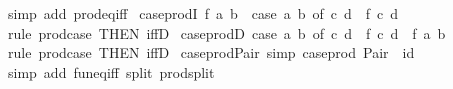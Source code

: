 \begin{isabellebody}
\ {\isacharparenleft}{\kern0pt}simp\ add{\isacharcolon}{\kern0pt}\ prod{\isacharunderscore}{\kern0pt}eq{\isacharunderscore}{\kern0pt}iff{\isacharparenright}{\kern0pt}%
\endisatagproof
{\isafoldproof}%
%
\isadelimproof
\isanewline
%
\endisadelimproof
\isanewline
{}\isamarkupfalse%
\ case{\isacharunderscore}{\kern0pt}prodI{\isacharcolon}{\kern0pt}\ {\isachardoublequoteopen}f\ a\ b\ {\isasymLongrightarrow}\ case\ {\isacharparenleft}{\kern0pt}a{\isacharcomma}{\kern0pt}\ b{\isacharparenright}{\kern0pt}\ of\ {\isacharparenleft}{\kern0pt}c{\isacharcomma}{\kern0pt}\ d{\isacharparenright}{\kern0pt}\ {\isasymRightarrow}\ f\ c\ d{\isachardoublequoteclose}\isanewline
%
\isadelimproof
\ \ %
\endisadelimproof
%
\isatagproof
{}\isamarkupfalse%
\ {\isacharparenleft}{\kern0pt}rule\ prod{\isachardot}{\kern0pt}case\ {\isacharbrackleft}{\kern0pt}THEN\ iffD{}{\isacharbrackright}{\kern0pt}{\isacharparenright}{\kern0pt}%
\endisatagproof
{\isafoldproof}%
%
\isadelimproof
\isanewline
%
\endisadelimproof
\isanewline
{}\isamarkupfalse%
\ case{\isacharunderscore}{\kern0pt}prodD{\isacharcolon}{\kern0pt}\ {\isachardoublequoteopen}{\isacharparenleft}{\kern0pt}case\ {\isacharparenleft}{\kern0pt}a{\isacharcomma}{\kern0pt}\ b{\isacharparenright}{\kern0pt}\ of\ {\isacharparenleft}{\kern0pt}c{\isacharcomma}{\kern0pt}\ d{\isacharparenright}{\kern0pt}\ {\isasymRightarrow}\ f\ c\ d{\isacharparenright}{\kern0pt}\ {\isasymLongrightarrow}\ f\ a\ b{\isachardoublequoteclose}\isanewline
%
\isadelimproof
\ \ %
\endisadelimproof
%
\isatagproof
{}\isamarkupfalse%
\ {\isacharparenleft}{\kern0pt}rule\ prod{\isachardot}{\kern0pt}case\ {\isacharbrackleft}{\kern0pt}THEN\ iffD{}{\isacharbrackright}{\kern0pt}{\isacharparenright}{\kern0pt}%
\endisatagproof
{\isafoldproof}%
%
\isadelimproof
\isanewline
%
\endisadelimproof
\isanewline
{}\isamarkupfalse%
\ case{\isacharunderscore}{\kern0pt}prod{\isacharunderscore}{\kern0pt}Pair\ {\isacharbrackleft}{\kern0pt}simp{\isacharbrackright}{\kern0pt}{\isacharcolon}{\kern0pt}\ {\isachardoublequoteopen}case{\isacharunderscore}{\kern0pt}prod\ Pair\ {\isacharequal}{\kern0pt}\ id{\isachardoublequoteclose}\isanewline
%
\isadelimproof
\ \ %
\endisadelimproof
%
\isatagproof
{}\isamarkupfalse%
\ {\isacharparenleft}{\kern0pt}simp\ add{\isacharcolon}{\kern0pt}\ fun{\isacharunderscore}{\kern0pt}eq{\isacharunderscore}{\kern0pt}iff\ split{\isacharcolon}{\kern0pt}\ prod{\isachardot}{\kern0pt}split{\isacharparenright}{\kern0pt}%
\endisatagproof
{\isafoldproof}%
%
\isadelimproof

\end{isabellebody}
